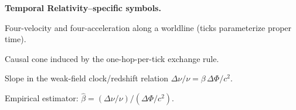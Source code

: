 \noindent\textbf{Temporal Relativity–specific symbols.}
\begin{description}[leftmargin=2.4em,labelsep=0.8em]
  \item[\(u^\mu,\,a^\mu\)] Four-velocity and four-acceleration along a worldline (ticks parameterize proper time).
  \item[\(\mathcal{C}\)] Causal cone induced by the one-hop-per-tick exchange rule.
  \item[\(\beta\)] Slope in the weak-field clock/redshift relation 
        \(\Delta\nu/\nu = \beta\,\Delta\Phi / c^2.\)
  \item[\(\hat{\beta}\)] Empirical estimator:
        \(\hat{\beta} = (\Delta\nu/\nu)\big/(\Delta\Phi / c^2).\)
\end{description}
